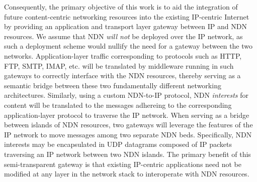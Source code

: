 Consequently, the primary objective of this work is to aid the integration of future content-centric networking resources into the existing IP-centric Internet by providing an application and transport layer gateway between IP and NDN resources. We assume that NDN \emph{will not} be deployed over the IP network, as such a deployment scheme would nullify the need for a gateway between the two networks. Application-layer traffic corresponding to protocols such as HTTP, FTP, SMTP, IMAP, etc. will be translated by middleware running in such gateways to correctly interface with the NDN resources, thereby serving as a semantic bridge between these two fundamentally different networking architectures. Similarly, using a custom NDN-to-IP protocol, NDN \emph{interests} for content will be translated to the messages adhereing to the corresponding application-layer protocol to traverse the IP network. When serving as a bridge between islands of NDN resources, two gateways will leverage the features of the IP network to move messages among two separate NDN beds. Specifically, NDN interests may be encapsulated in UDP datagrams composed of IP packets traversing an IP network between two NDN islands. The primary benefit of this semi-transparent gateway is that existing IP-centric applications need not be modified at any layer in the network stack to interoperate with NDN resources. 





